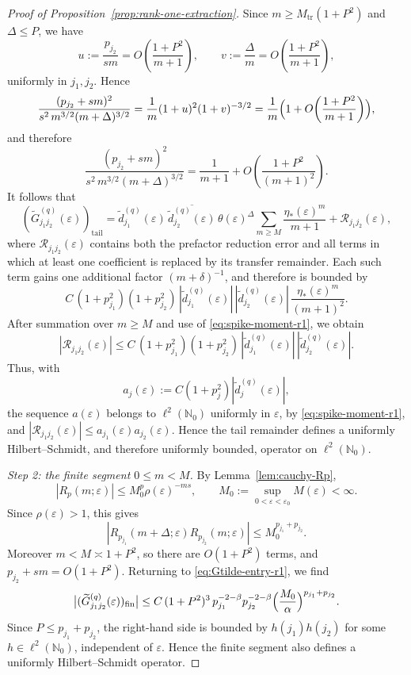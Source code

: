 \documentclass[11pt]{amsart}
\numberwithin{equation}{section}
\theoremstyle{plain}
\theoremstyle{definition}
\theoremstyle{remark}
\begin{document}
\begin{proof}[Proof of Proposition~\ref{prop:rank-one-extraction}]
Since \(m\ge M_{\mathrm{tr}}(1+P^2)\) and \(\Delta\le P\), we have
\[
u:=\frac{p_{j_2}}{sm}
=
O\!\left(\frac{1+P^2}{m+1}\right),
\qquad
v:=\frac{\Delta}{m}
=
O\!\left(\frac{1+P^2}{m+1}\right),
\]
uniformly in \(j_1,j_2\). Hence
\[
\frac{(p_{j_2}+sm)^2}{s^2\,m^{3/2}(m+\Delta)^{3/2}}
=
\frac1m(1+u)^2(1+v)^{-3/2}
=
\frac1m\Bigl(1+O\!\left(\frac{1+P^2}{m+1}\right)\Bigr),
\]
and therefore
\[
\frac{(p_{j_2}+sm)^2}{s^2\,m^{3/2}(m+\Delta)^{3/2}}
=
\frac{1}{m+1}
+
O\!\left(\frac{1+P^2}{(m+1)^2}\right).
\]
It follows that
\begin{equation}\label{eq:tail-structure-r1}
(\widetilde G^{(q)}_{j_1j_2}(\varepsilon))_{\mathrm{tail}}
=
\widetilde d^{(q)}_{j_1}(\varepsilon)\,
\overline{\widetilde d^{(q)}_{j_2}(\varepsilon)}\,
\theta(\varepsilon)^\Delta
\sum_{m\ge M}\frac{\eta_*(\varepsilon)^m}{m+1}
+
\mathcal R_{j_1j_2}(\varepsilon),
\end{equation}
where \(\mathcal R_{j_1j_2}(\varepsilon)\) contains both the prefactor reduction
error and all terms in which at least one coefficient is replaced by its
transfer remainder. Each such term gains one additional factor
\((m+\delta)^{-1}\), and therefore is bounded by
\[
C\,(1+p_{j_1}^2)(1+p_{j_2}^2)\,
|\widetilde d^{(q)}_{j_1}(\varepsilon)|\,
|\widetilde d^{(q)}_{j_2}(\varepsilon)|\,
\frac{\eta_*(\varepsilon)^m}{(m+1)^2}.
\]
After summation over \(m\ge M\) and use of \eqref{eq:spike-moment-r1}, we obtain
\begin{equation}\label{eq:tail-remainder-envelope-r1}
|\mathcal R_{j_1j_2}(\varepsilon)|
\le
C\,(1+p_{j_1}^2)(1+p_{j_2}^2)\,
|\widetilde d^{(q)}_{j_1}(\varepsilon)|\,
|\widetilde d^{(q)}_{j_2}(\varepsilon)|.
\end{equation}
Thus, with
\[
a_j(\varepsilon):=C(1+p_j^2)|\widetilde d^{(q)}_j(\varepsilon)|,
\]
the sequence \(a(\varepsilon)\) belongs to \(\ell^2(\mathbb N_0)\) uniformly in
\(\varepsilon\), by \eqref{eq:spike-moment-r1}, and
\(
|\mathcal R_{j_1j_2}(\varepsilon)|
\le a_{j_1}(\varepsilon)a_{j_2}(\varepsilon)
\).
Hence the tail remainder defines a uniformly Hilbert--Schmidt, and therefore
uniformly bounded, operator on \(\ell^2(\mathbb N_0)\).

\smallskip
\noindent
\textit{Step 2: the finite segment \(0\le m<M\).}
By Lemma~\ref{lem:cauchy-Rp},
\[
|R_p(m;\varepsilon)|
\le
M_0^p\rho(\varepsilon)^{-ms},
\qquad
M_0:=\sup_{0<\varepsilon<\varepsilon_0}M(\varepsilon)<\infty.
\]
Since \(\rho(\varepsilon)>1\), this gives
\[
|R_{p_{j_1}}(m+\Delta;\varepsilon)R_{p_{j_2}}(m;\varepsilon)|
\le
M_0^{p_{j_1}+p_{j_2}}.
\]
Moreover \(m<M\asymp 1+P^2\), so there are \(O(1+P^2)\) terms, and
\(p_{j_2}+sm=O(1+P^2)\). Returning to \eqref{eq:Gtilde-entry-r1}, we find
\[
\bigl|(\widetilde G^{(q)}_{j_1j_2}(\varepsilon))_{\mathrm{fin}}\bigr|
\le
C\,(1+P^2)^3\,p_{j_1}^{-2-\beta}p_{j_2}^{-2-\beta}
\Bigl(\frac{M_0}{\alpha}\Bigr)^{p_{j_1}+p_{j_2}}.
\]
Since \(P\le p_{j_1}+p_{j_2}\), the right-hand side is bounded by
\(h(j_1)h(j_2)\) for some \(h\in\ell^2(\mathbb N_0)\), independent of
\(\varepsilon\). Hence the finite segment also defines a uniformly
Hilbert--Schmidt operator.


\end{proof}
\end{document}
